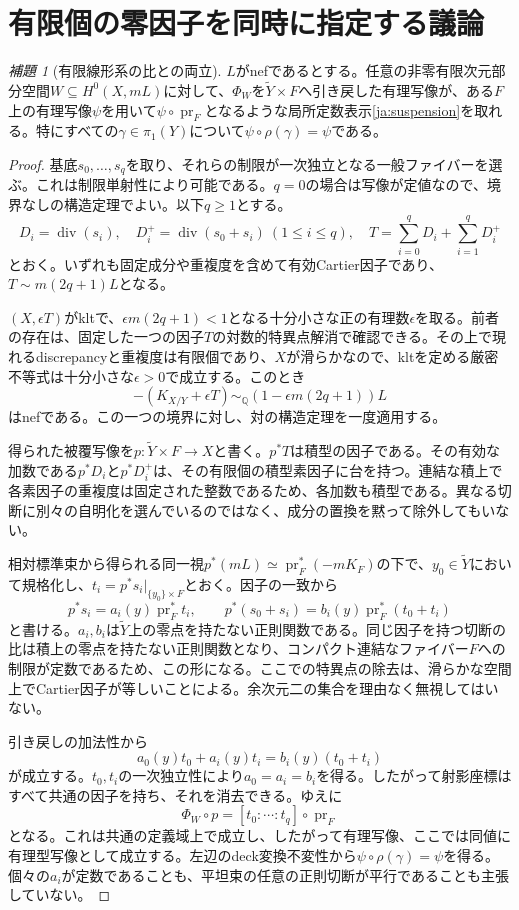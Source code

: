 \documentclass[12pt]{amsart}
\theoremstyle{definition}
\theoremstyle{remark}
\numberwithin{equation}{section}
\newcommand{\Div}{\operatorname{div}}
\DeclareMathOperator{\pr}{pr}
\newcommand{\Q}{\mathbb{Q}}
\newtheorem{jlem}[thm]{補題}
\begin{document}
\section{有限個の零因子を同時に指定する議論}\label{ja:mark}
\begin{jlem}[有限線形系の比との両立]\label{ja:marklemma}
$L$がnefであるとする。任意の非零有限次元部分空間$W\subseteq H^0(X,mL)$に対して、$\Phi_W$を$\widetilde Y\times F$へ引き戻した有理写像が、ある$F$上の有理写像$\psi$を用いて$\psi\circ\pr_F$となるような局所定数表示\eqref{ja:suspension}を取れる。特にすべての$\gamma\in\pi_1(Y)$について$\psi\circ\rho(\gamma)=\psi$である。
\end{jlem}
\begin{proof}
基底$s_0,\ldots,s_q$を取り、それらの制限が一次独立となる一般ファイバーを選ぶ。これは制限単射性により可能である。$q=0$の場合は写像が定値なので、境界なしの構造定理でよい。以下$q\geq1$とする。
\[
 D_i=\Div(s_i),\quad D_i^+=\Div(s_0+s_i)\ (1\leq i\leq q),
 \quad T=\sum_{i=0}^qD_i+\sum_{i=1}^qD_i^+
\]
とおく。いずれも固定成分や重複度を含めて有効Cartier因子であり、$T\sim m(2q+1)L$となる。

$(X,\epsilon T)$がkltで、$\epsilon m(2q+1)<1$となる十分小さな正の有理数$\epsilon$を取る。前者の存在は、固定した一つの因子$T$の対数的特異点解消で確認できる。その上で現れるdiscrepancyと重複度は有限個であり、$X$が滑らかなので、kltを定める厳密不等式は十分小さな$\epsilon>0$で成立する。このとき
\begin{equation}\label{ja:perturb}
 -(K_{X/Y}+\epsilon T)\sim_\Q
 (1-\epsilon m(2q+1))L
\end{equation}
はnefである。この一つの境界に対し、対の構造定理を一度適用する。

得られた被覆写像を$p:\widetilde Y\times F\to X$と書く。$p^*T$は積型の因子である。その有効な加数である$p^*D_i$と$p^*D_i^+$は、その有限個の積型素因子に台を持つ。連結な積上で各素因子の重複度は固定された整数であるため、各加数も積型である。異なる切断に別々の自明化を選んでいるのではなく、成分の置換を黙って除外してもいない。

相対標準束から得られる同一視$p^*(mL)\simeq\pr_F^*(-mK_F)$の下で、$y_0\in\widetilde Y$において規格化し、$t_i=p^*s_i|_{\{y_0\}\times F}$とおく。因子の一致から
\[
 p^*s_i=a_i(y)\pr_F^*t_i,
 \qquad p^*(s_0+s_i)=b_i(y)\pr_F^*(t_0+t_i)
\]
と書ける。$a_i,b_i$は$\widetilde Y$上の零点を持たない正則関数である。同じ因子を持つ切断の比は積上の零点を持たない正則関数となり、コンパクト連結なファイバー$F$への制限が定数であるため、この形になる。ここでの特異点の除去は、滑らかな空間上でCartier因子が等しいことによる。余次元二の集合を理由なく無視してはいない。

引き戻しの加法性から
\[
 a_0(y)t_0+a_i(y)t_i=b_i(y)(t_0+t_i)
\]
が成立する。$t_0,t_i$の一次独立性により$a_0=a_i=b_i$を得る。したがって射影座標はすべて共通の因子を持ち、それを消去できる。ゆえに
\[
 \Phi_W\circ p=[t_0:\cdots:t_q]\circ\pr_F
\]
となる。これは共通の定義域上で成立し、したがって有理写像、ここでは同値に有理型写像として成立する。左辺のdeck変換不変性から$\psi\circ\rho(\gamma)=\psi$を得る。個々の$a_i$が定数であることも、平坦束の任意の正則切断が平行であることも主張していない。
\end{proof}
\end{document}
